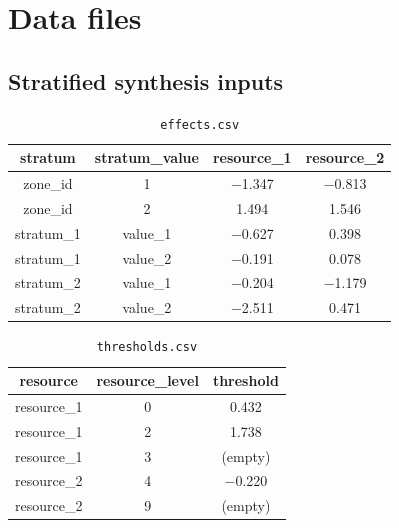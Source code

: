 \section{Data files}

\newcommand{\hd}[1]{\textcolor{CtpText}{#1}}
\newcommand{\emptycell}{\textcolor{CtpOverlay2}{(empty)}}

\subsection{Stratified synthesis inputs}

\begin{table}[htbp]
	\centering
	\caption{\texttt{effects.csv}}
	\begin{tabular}{TTNN}
		\toprule
		\hd{stratum} & \hd{stratum\_value} & \hd{resource\_1} & \hd{resource\_2} \\
		\midrule
		zone\_id & 1 & \num{-1.347} & \num{-0.813} \\
		zone\_id & 2 & \num{1.494} & \num{1.546} \\
		stratum\_1 & value\_1 & \num{-0.627} & \num{0.398} \\
		stratum\_1 & value\_2 & \num{-0.191} & \num{0.078} \\
		stratum\_2 & value\_1 & \num{-0.204} & \num{-1.179} \\
		stratum\_2 & value\_2 & \num{-2.511} & \num{0.471} \\
		\bottomrule
	\end{tabular}
\end{table}
\FloatBarrier

\begin{table}[htbp]
	\centering
	\caption{\texttt{thresholds.csv}}
	\begin{tabular}{TTN}
		\toprule
		\hd{resource} & \hd{resource\_level} & \hd{threshold} \\
		\midrule
		resource\_1 & 0 & \num{0.432} \\
		resource\_1 & 2 & \num{1.738} \\
		resource\_1 & 3 & \emptycell \\
		resource\_2 & 4 & \num{-0.220} \\
		resource\_2 & 9 & \emptycell \\
		\bottomrule
	\end{tabular}
\end{table}
\FloatBarrier

